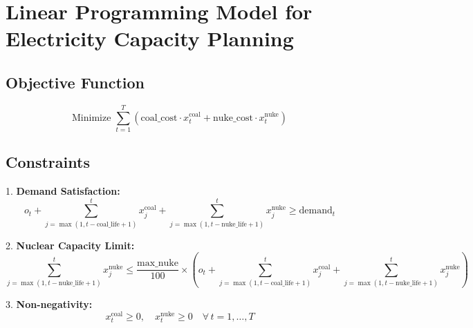 \documentclass{article}
\begin{document}
\section*{Linear Programming Model for Electricity Capacity Planning}

\subsection*{Objective Function}

\[
\text{Minimize } \sum_{t=1}^T \left( \text{coal\_cost} \cdot x_t^{\text{coal}} + \text{nuke\_cost} \cdot x_t^{\text{nuke}} \right)
\]

\subsection*{Constraints}

1. \textbf{Demand Satisfaction:}
   \[
   o_t + \sum_{j=\max(1, t-\text{coal\_life}+1)}^{t} x_j^{\text{coal}} + \sum_{j=\max(1, t-\text{nuke\_life}+1)}^{t} x_j^{\text{nuke}} \geq \text{demand}_t
   \]

2. \textbf{Nuclear Capacity Limit:}
   \[
   \sum_{j=\max(1, t-\text{nuke\_life}+1)}^{t} x_j^{\text{nuke}} \leq \frac{\text{max\_nuke}}{100} \times \left( o_t + \sum_{j=\max(1, t-\text{coal\_life}+1)}^{t} x_j^{\text{coal}} + \sum_{j=\max(1, t-\text{nuke\_life}+1)}^{t} x_j^{\text{nuke}} \right)
   \]

3. \textbf{Non-negativity:}
   \[
   x_t^{\text{coal}} \geq 0, \quad x_t^{\text{nuke}} \geq 0 \quad \forall \, t = 1, \ldots, T
   \]
\end{document}
